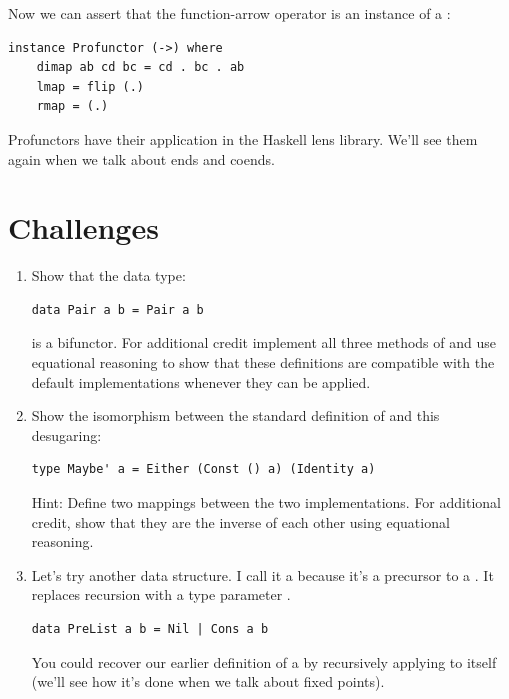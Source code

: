 \noindent
Now we can assert that the function-arrow operator is an instance of a
:

\begin{Verbatim}
instance Profunctor (->) where
    dimap ab cd bc = cd . bc . ab
    lmap = flip (.)
    rmap = (.)
\end{Verbatim}
Profunctors have their application in the Haskell lens library. We'll
see them again when we talk about ends and coends.

\section{Challenges}\label{challenges}

\begin{enumerate}
\tightlist
\item
  Show that the data type:

\begin{Verbatim}[commandchars=\\\{\}]
data Pair a b = Pair a b
\end{Verbatim}

  is a bifunctor. For additional credit implement all three methods of
   and use equational reasoning to show that these
  definitions are compatible with the default implementations whenever
  they can be applied.
\item
  Show the isomorphism between the standard definition of 
  and this desugaring:

\begin{Verbatim}
type Maybe' a = Either (Const () a) (Identity a)
\end{Verbatim}

  Hint: Define two mappings between the two implementations. For
  additional credit, show that they are the inverse of each other using
  equational reasoning.
\item
  Let's try another data structure. I call it a  because
  it's a precursor to a . It replaces recursion with a type
  parameter .

\begin{Verbatim}[commandchars=\\\{\}]
data PreList a b = Nil | Cons a b
\end{Verbatim}

  You could recover our earlier definition of a  by
  recursively applying  to itself (we'll see how it's
  done when we talk about fixed points).


\end{enumerate}
